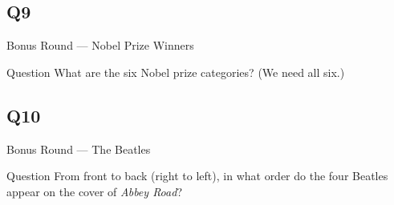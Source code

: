 \documentclass[11pt]{beamer}
\begin{document}
\subsection*{Q9}
\begin{frame}[t]{Bonus Round --- Nobel Prize Winners}
\vspace{-0.5em}
\begin{block}{Question}
What are the six Nobel prize categories? (We need all six.)
\end{block}
\end{frame}
\subsection*{Q10}
\begin{frame}[t]{Bonus Round --- The Beatles}
\vspace{-0.5em}
\begin{block}{Question}
From front to back (right to left), in what order do the four Beatles appear on the cover of \emph{Abbey Road}?
\end{block}
\end{frame}
\end{document}
